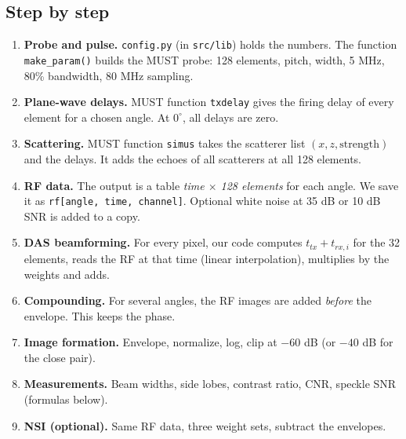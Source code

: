 \documentclass[11pt,a4paper]{article}
\newcommand{\file}[1]{\texttt{#1}}
\begin{document}
\subsection{Step by step}
\begin{enumerate}[label=\textbf{Step \arabic*.},leftmargin=*,labelsep=0.5em]
\item \textbf{Probe and pulse.} \file{config.py} (in \file{src/lib}) holds the numbers. The function \texttt{make\_param()} builds the MUST probe: 128 elements, pitch, width, 5 MHz, 80\% bandwidth, 80 MHz sampling.
\item \textbf{Plane-wave delays.} MUST function \texttt{txdelay} gives the firing delay of every element for a chosen angle. At $0^\circ$, all delays are zero.
\item \textbf{Scattering.} MUST function \texttt{simus} takes the scatterer list $(x, z, \text{strength})$ and the delays. It adds the echoes of all scatterers at all 128 elements.
\item \textbf{RF data.} The output is a table \emph{time $\times$ 128 elements} for each angle. We save it as \texttt{rf[angle, time, channel]}. Optional white noise at 35 dB or 10 dB SNR is added to a copy.
\item \textbf{DAS beamforming.} For every pixel, our code computes $t_{tx} + t_{rx,i}$ for the 32 elements, reads the RF at that time (linear interpolation), multiplies by the weights and adds.
\item \textbf{Compounding.} For several angles, the RF images are added \emph{before} the envelope. This keeps the phase.
\item \textbf{Image formation.} Envelope, normalize, log, clip at $-60$ dB (or $-40$ dB for the close pair).
\item \textbf{Measurements.} Beam widths, side lobes, contrast ratio, CNR, speckle SNR (formulas below).
\item \textbf{NSI (optional).} Same RF data, three weight sets, subtract the envelopes.
\end{enumerate}
\end{document}
